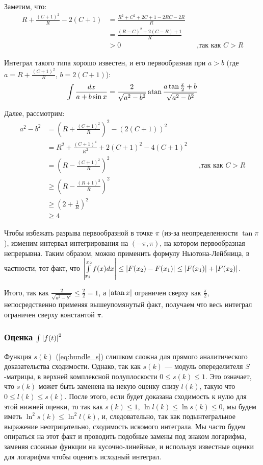 Заметим, что:
\begin{align*}
   R + \frac{(C + 1)^2}{R} - 2 (C + 1)
   &= \frac{R^2 + C^2 + 2C + 1 - 2 RC - 2 R}{R}
\\ &= \frac{(R - C)^2 + 2(C - R) + 1}{R}
\\ &> 0 && \text{,так как $C > R$} 
\end{align*}

Интеграл такого типа хорошо известен, и его первообразная при $a > b$ (где $a = R + \frac{(C + 1)^2}{R}$, $b = 2 (C + 1)$):
\[
\int \frac{dx}{a + b \sin x} = \frac{2}{\sqrt{a^2 - b^2}} \atan \frac{a \tan \frac{x}{2} + b}{\sqrt{a^2 - b^2}}
\]

Далее, рассмотрим:
\begin{align*}
a^2 - b^2
& =  (R + \frac{(C + 1)^2}{R})^2 - (2 (C + 1))^2\\
& =  R^2 + \frac{(C+1)^4}{R^2} + 2 (C+1)^2 - 4 (C + 1)^2 \\
& =  (R - \frac{(C + 1)^2}{R})^2 && \text{,так как $C > R$} \\
&\ge (R - \frac{(R + 1)^2}{R})^2 \\
&\ge (2 + \frac{1}{R})^2 \\
&\ge 4
\end{align*}

Чтобы избежать разрыва первообразной в точке $\pi$ (из-за неопределенности $\tan \pi$), изменим интервал интегрирования на $(-\pi, \pi)$, на котором первообразная непрерывна. Таким образом, можно применить формулу Ньютона-Лейбница, в частности, тот факт, что $\abs{\int\limits_{x_1}^{x_2} f(x) dx} \le \abs{F(x_2) - F(x_1)} \le \abs{F(x_1)} + \abs{F(x_2)}$.

Итого, так как $\frac{2}{\sqrt{a^2 - b^2}} \le \frac{2}{2} = 1$, а $\abs{\atan x}$ ограничен сверху как $\frac{\pi}{2}$, непосредственно применяя вышеупомянутый факт, получаем что весь интеграл ограничен сверху константой $\pi$.


\subsubsection{Оценка $\int \abs{f(t)}^2$}
Функция $s(k)$ (\ref{eq:bundle_s}) слишком сложна для прямого аналитического доказательства сходимости. Однако, так как $s(k)$ — модуль опеределителя $S$-матрицы, в верхней комплексной полуплоскости $0 \le s(k) \le 1$. Это означает, что $s(k)$ может быть заменена на некую оценку снизу $l(k)$, такую что $0 \le l(k) \le s(k)$. После этого, если будет доказана сходимость к нулю для этой нижней оценки, то так как $s(k) \le 1$, $\ln l(k) \le \ln s(k) \le 0$, мы будем иметь $\ln^2 s(k) \le \ln^2 l(k)$, и, следовательно, так как подынтегральное выражение неотрицательно, сходимость искомого интеграла. Мы часто будем опираться на этот факт и проводить подобные замены под знаком логарифма, заменяя сложные функции на кусочно-линейные, и используя известные оценки для логарифма чтобы оценить исходный интеграл.

